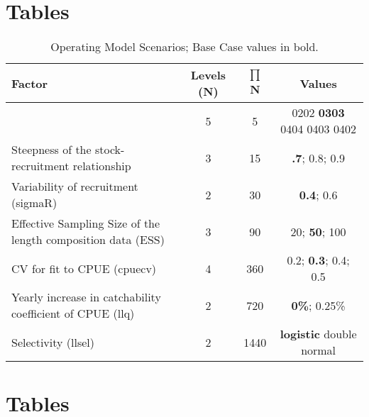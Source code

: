 



\newpage


\clearpage
\newpage




\newpage\clearpage



\clearpage
\newpage

\section*{Tables}

\begin{table}[ht]
\label{tab:grid}
\caption{Operating Model Scenarios; Base Case values in bold.}  
\begin{center}
\label{tab:datasumm}
\small

\begin{tabular}{|lccc|}

\hline
Factor & {Levels (N)} & {$\prod$ N} & {Values} \\ %
\hline\hline
{Natural mortality (M)& {5}}  & {  5}  & { 0202  \textbf{0303} 0404 0403 0402}    \\
{Steepness of the stock-recruitment relationship}}& {3} 	 & {15}  & { \textbf{.7}; 0.8; 0.9} \\
{Variability of recruitment (sigmaR)}& {2} 	 & { 30}  & { \textbf{0.4}; 0.6} \\
{Effective Sampling Size of the length composition data (ESS)}& {3} & { 90}  & { 20; \textbf{50}; 100} \\
{CV for fit to CPUE (cpuecv)}& {4} 	 & { 360}  & { 0.2;  \textbf{0.3}; 0.4; 0.5} \\
{Yearly increase in catchability coefficient of CPUE (llq)}& {2} 	 & {  720}  & { \textbf{0\%}; 0.25\%} \\
  {Selectivity (llsel)}& {2}}& {1440}} & { \textbf{logistic} double normal} \\
\hline

\end{tabular}
\end{center}
\end{table}

\newpage




\clearpage
\newpage
\section{Tables}

